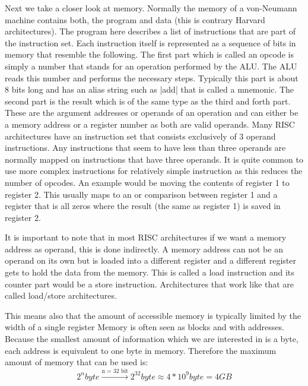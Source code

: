 Next we take a closer look at memory.
Normally the memory of a von-Neumann machine contains both, the program and data (this is contrary Harvard architectures).
The program here describes a list of instructions that are part of the instruction set.
Each instruction itself is represented as a sequence of bits in memory that resemble the following.
The first part which is called an opcode is simply a number that stands for an operation performed by the ALU.
The ALU reads this number and performs the necessary steps.
Typically this part is about 8 bits long and has an alias string such as |add| that is called a mnemonic.
The second part is the result which is of the same type as the third and forth part.
These are the argument addresses or operands of an operation and can either be a memory address or a register number as both are valid operands.
Many RISC architectures have an instruction set that consists exclusively of 3 operand instructions.
Any instructions that seem to have less than three operands are normally mapped on instructions that have three operands.
It is quite common to use more complex instructions for relatively simple instruction as this reduces the number of opcodes.
An example would be moving the contents of register 1 to register 2.
This usually maps to an or comparison between register 1 and a register that is all zeros where the result (the same as register 1) is saved in register 2.

It is important to note that in most RISC architectures if we want a memory address as operand, this is done indirectly.
A memory address can not be an operand on its own but is loaded into a different register and a different register gets to hold the data from the memory.
This is called a load instruction and its counter part would be a store instruction.
Architectures that work like that are called load/store architectures.

This means also that the amount of accessible memory is typically limited by the width of a single register
Memory is often seen as blocks and with addresses.
Because the smallest amount of information which we are interested in is a byte, each address is equivalent to one byte in memory.
Therefore the maximum amount of memory that can be used is:
\begin{equation}
    2^{n} byte \xrightarrow{\text{n = 32 bit}} 2^{32} byte \approx 4*10^{9} byte = 4 GB
\end{equation}

